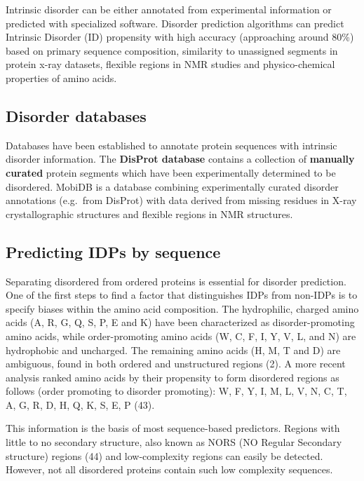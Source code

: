 \documentclass[
]{book}
\begin{document}
Intrinsic disorder can be either annotated from experimental information or predicted with specialized software. Disorder prediction algorithms can predict Intrinsic Disorder (ID) propensity with high accuracy (approaching around 80\%) based on primary sequence composition, similarity to unassigned segments in protein x-ray datasets, flexible regions in NMR studies and physico-chemical properties of amino acids.

\hypertarget{disorder-databases}{%
\subsection{Disorder databases}\label{disorder-databases}}

Databases have been established to annotate protein sequences with intrinsic disorder information. The \textbf{DisProt database} contains a collection of \textbf{manually curated} protein segments which have been experimentally determined to be disordered. MobiDB is a database combining experimentally curated disorder annotations (e.g.~from DisProt) with data derived from missing residues in X-ray crystallographic structures and flexible regions in NMR structures.

\hypertarget{predicting-idps-by-sequence}{%
\subsection{Predicting IDPs by sequence}\label{predicting-idps-by-sequence}}

Separating disordered from ordered proteins is essential for disorder prediction. One of the first steps to find a factor that distinguishes IDPs from non-IDPs is to specify biases within the amino acid composition. The hydrophilic, charged amino acids (A, R, G, Q, S, P, E and K) have been characterized as disorder-promoting amino acids, while order-promoting amino acids (W, C, F, I, Y, V, L, and N) are hydrophobic and uncharged. The remaining amino acids (H, M, T and D) are ambiguous, found in both ordered and unstructured regions (2). A more recent analysis ranked amino acids by their propensity to form disordered regions as follows (order promoting to disorder promoting): W, F, Y, I, M, L, V, N, C, T, A, G, R, D, H, Q, K, S, E, P (43).

This information is the basis of most sequence-based predictors. Regions with little to no secondary structure, also known as NORS (NO Regular Secondary structure) regions (44) and low-complexity regions can easily be detected. However, not all disordered proteins contain such low complexity sequences.
\end{document}
